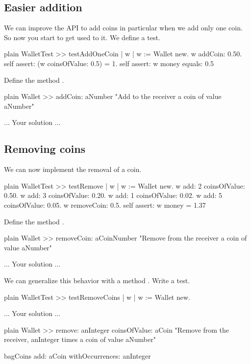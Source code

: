 \documentclass[10pt,twoside,english]{_support/latex/sbabook/sbabook}
\begin{document}
\subsection{Easier addition}
We can improve the API to add coins in particular when we add only one coin. 
So now you start to get used to it. We define a test. 

\begin{displaycode}{plain}
WalletTest >> testAddOneCoin
	| w |
	w := Wallet new.
	w addCoin: 0.50.
	self assert: (w coinsOfValue: 0.5) = 1.
	self assert: w money equals: 0.5
\end{displaycode}

Define the method .

\begin{displaycode}{plain}
Wallet >> addCoin: aNumber
	"Add to the receiver a coin of value aNumber"
	
	... Your solution ...
\end{displaycode}
\subsection{Removing coins}
We can now implement the removal of a coin. 

\begin{displaycode}{plain}
WalletTest >> testRemove
	| w |
	w := Wallet new.
	w add: 2 coinsOfValue: 0.50.
	w add: 3 coinsOfValue: 0.20.
	w add: 1 coinsOfValue: 0.02.
	w add: 5 coinsOfValue: 0.05.
	w removeCoin: 0.5.
	self assert: w money = 1.37
\end{displaycode}

Define the method .

\begin{displaycode}{plain}
Wallet >> removeCoin: aCoinNumber
	"Remove from the receiver a coin of value aNumber"
	
	... Your solution ...
\end{displaycode}

We can generalize this behavior with a method .
Write a test.

\begin{displaycode}{plain}
WalletTest >> testRemoveCoins
	| w |
	w := Wallet new.
	
	... Your solution ...
\end{displaycode}

\begin{displaycode}{plain}
Wallet >> remove: anInteger coinsOfValue: aCoin
	"Remove from the receiver, anInteger times a coin of value aNumber"

	bagCoins add: aCoin withOccurrences: anInteger 
\end{displaycode}
\end{document}
